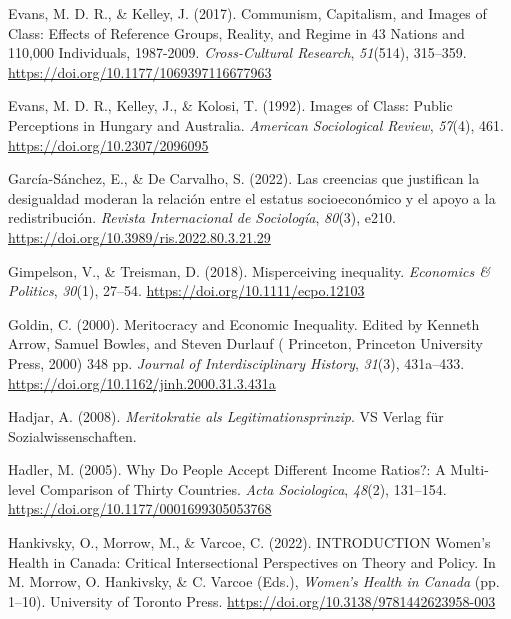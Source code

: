 \documentclass[
  12pt,
  a4paper,
]{article}
\newlength{\cslhangindent}
\newlength{\cslentryspacingunit} %
\newenvironment{CSLReferences}[2] %
 {%
  \setlength{\parindent}{0pt}
  \ifodd #1
  \let\oldpar\par
  \def\par{\hangindent=\cslhangindent\oldpar}
  \fi
  \setlength{\parskip}{#2\cslentryspacingunit}
 }%
 {}
\begin{document}
\begin{CSLReferences}{1}{0}
\leavevmode{}%
Evans, M. D. R., \& Kelley, J. (2017). Communism, {Capitalism}, and
{Images} of {Class}: {Effects} of {Reference Groups}, {Reality}, and
{Regime} in 43 {Nations} and 110,000 {Individuals}, 1987-2009.
\emph{Cross-Cultural Research}, \emph{51}(514), 315--359.
\url{https://doi.org/10.1177/1069397116677963}

\leavevmode{}%
Evans, M. D. R., Kelley, J., \& Kolosi, T. (1992). Images of {Class}:
{Public Perceptions} in {Hungary} and {Australia}. \emph{American
Sociological Review}, \emph{57}(4), 461.
\url{https://doi.org/10.2307/2096095}

\leavevmode{}%
García-Sánchez, E., \& De Carvalho, S. (2022). Las creencias que
justifican la desigualdad moderan la relaci{ó}n entre el estatus
socioecon{ó}mico y el apoyo a la redistribuci{ó}n. \emph{Revista
Internacional de Sociolog{í}a}, \emph{80}(3), e210.
\url{https://doi.org/10.3989/ris.2022.80.3.21.29}

\leavevmode{}%
Gimpelson, V., \& Treisman, D. (2018). Misperceiving inequality.
\emph{Economics \& Politics}, \emph{30}(1), 27--54.
\url{https://doi.org/10.1111/ecpo.12103}

\leavevmode{}%
Goldin, C. (2000). Meritocracy and {Economic Inequality}. {Edited} by
{Kenneth Arrow}, {Samuel Bowles}, and {Steven Durlauf} ( {Princeton},
{Princeton University Press}, 2000) 348 pp. \emph{Journal of
Interdisciplinary History}, \emph{31}(3), 431a--433.
\url{https://doi.org/10.1162/jinh.2000.31.3.431a}

\leavevmode{}%
Hadjar, A. (2008). \emph{{Meritokratie als Legitimationsprinzip}}. VS
Verlag f{ü}r Sozialwissenschaften.

\leavevmode{}%
Hadler, M. (2005). Why {Do People Accept Different Income Ratios}?: {A
Multi-level Comparison} of {Thirty Countries}. \emph{Acta Sociologica},
\emph{48}(2), 131--154. \url{https://doi.org/10.1177/0001699305053768}

\leavevmode{}%
Hankivsky, O., Morrow, M., \& Varcoe, C. (2022). {INTRODUCTION Women}'s
{Health} in {Canada}: {Critical Intersectional Perspectives} on {Theory}
and {Policy}. In M. Morrow, O. Hankivsky, \& C. Varcoe (Eds.),
\emph{Women's {Health} in {Canada}} (pp. 1--10). University of Toronto
Press. \url{https://doi.org/10.3138/9781442623958-003}


\end{CSLReferences}
\end{document}
